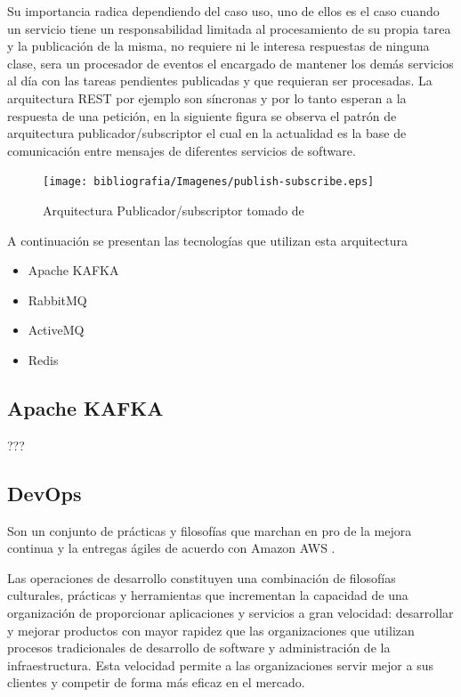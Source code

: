 Su importancia radica dependiendo del caso uso, uno de ellos es el caso cuando un servicio tiene un responsabilidad limitada al procesamiento de su propia tarea y la publicación de la misma, no requiere ni le interesa respuestas de ninguna clase, sera un procesador de eventos el encargado de mantener los demás servicios al día con las tareas pendientes publicadas y que requieran ser procesadas. La arquitectura REST por ejemplo son síncronas y por lo tanto esperan a la respuesta de una petición, en la siguiente figura se observa el patrón de arquitectura publicador/subscriptor el cual en la actualidad es la base de comunicación entre mensajes de diferentes servicios de software.

\begin{figure}[H]
    \centering
    \texttt{[image: bibliografia/Imagenes/publish-subscribe.eps]}
    \caption{Arquitectura Publicador/subscriptor tomado de \cite{microsftPub/Sub}}
\end{figure}

A continuación se presentan las tecnologías que utilizan esta arquitectura
\begin{itemize}
    \item Apache KAFKA
    \item RabbitMQ
    \item ActiveMQ
    \item Redis
\end{itemize}

\subsection {Apache KAFKA}
???

\subsection{DevOps}

Son un conjunto de prácticas y filosofías que marchan en pro de la mejora continua y la entregas ágiles de acuerdo con Amazon AWS \cite{awsDevOps}. 

Las operaciones de desarrollo constituyen una combinación de filosofías culturales, prácticas y herramientas que incrementan la capacidad de una organización de proporcionar aplicaciones y servicios a gran velocidad: desarrollar y mejorar productos con mayor rapidez que las organizaciones que utilizan procesos tradicionales de desarrollo de software y administración de la infraestructura. Esta velocidad permite a las organizaciones servir mejor a sus clientes y competir de forma más eficaz en el mercado.

